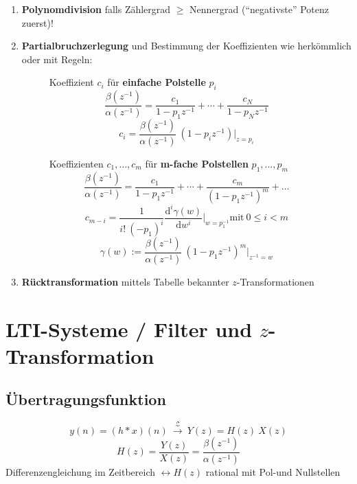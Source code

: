 \documentclass[10pt,a4paper]{article}
\newcommand{\ztransform}{
	~\xrightarrow{~\mathcal{Z}~}~
}
\begin{document}
\begin{enumerate}
\item \textbf{Polynomdivision} falls Zählergrad $\geq$ Nennergrad (``negativste'' Potenz zuerst)!
\item \textbf{Partialbruchzerlegung} und Bestimmung der Koeffizienten wie herkömmlich oder mit Regeln:
\begin{figure}[H]
	\centering
	\setlength{\fboxsep}{10pt}
	\begin{adjustbox}{valign=h,center=0.42\textwidth,margin=1ex,minipage=[t][][t]{0.37\textwidth},bgcolor=white,cfbox=black 1.5pt 0pt 1pt}
		Koeffizient $c_i$ für \textbf{einfache Polstelle} $p_i$
		\[ \frac{\beta(z^{-1})}{\alpha(z^{-1})} = \frac{c_1}{1 - p_1 z^{-1}} + \cdots + \frac{c_N}{1 - p_N z^{-1}} \]
		\[ c_i = \frac{\beta(z^{-1})}{\alpha(z^{-1})} ~ (1 - p_i z^{-1}) \bigg |_{z = p_{i}} \]
		\vspace{3.8em}
	\end{adjustbox}
	\begin{adjustbox}{valign=h,center=0.48\textwidth,margin=1ex,minipage=[t][][t]{0.43\textwidth},bgcolor=white,cfbox=black 1.5pt 0pt 1pt}
		Koeffizienten $c_1, \ldots, c_m$ für \textbf{m-fache Polstellen} $p_1, \ldots, p_m$
		\[ \frac{\beta(z^{-1})}{\alpha(z^{-1})}=\frac{c_{1}}{1-p_{1}z^{-1}}+\cdots+\frac{c_{m}}{(1-p_{1}z^{-1})^m} + \ldots \]
		\[ c_{m - i} = \frac{1}{i! ~ (-p_1)^{i}}\frac{\mathrm d^{i} \gamma(w)}{\mathrm d w^{i}} \bigg |_{w = p_1^{-1}} \text{mit} ~ 0 \leq i < m \]
		\[ \gamma(w) := \frac{\beta(z^{-1})}{\alpha(z^{-1})} ~ \left(1 - p_1 z^{-1} \right)^m \bigg |_{z^{-1} = w} \]
	\end{adjustbox}
\end{figure}

\item \textbf{Rücktransformation} mittels Tabelle bekannter $z$-Transformationen

\end{enumerate}

\section*{LTI-Systeme / Filter und $z$-Transformation}
\subsection*{Übertragungsfunktion}
\[
	y(n) = (h * x)(n) \ztransform Y(z) = H(z) ~ X(z)
\]
\[
	H(z) = \frac{Y(z)}{X(z)} = \frac{\beta(z^{-1})}{\alpha(z^{-1})}
\]
	Differenzengleichung im Zeitbereich $\leftrightarrow H(z)$ rational mit Pol-und Nullstellen\\
\end{document}
